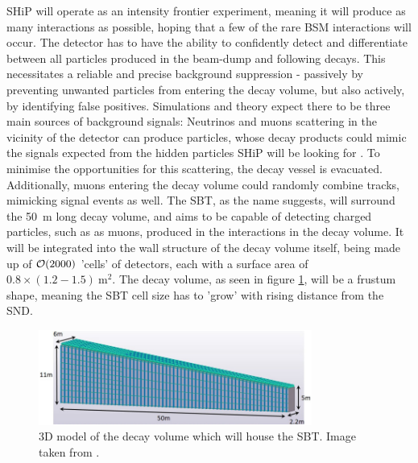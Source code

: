 	\ac{SHiP} will operate as an intensity frontier experiment, meaning it will produce as many interactions as possible, hoping that a few of the rare \ac{BSM} interactions will occur. The detector has to have the ability to confidently detect and differentiate between all particles produced in the beam-dump and following decays. This necessitates a reliable and precise background suppression - passively by preventing unwanted particles from entering the decay volume, but also actively, by identifying false positives. Simulations and theory expect there to be three main sources of background signals: Neutrinos and muons scattering in the vicinity of the detector can produce particles, whose decay products could mimic the signals expected from the hidden particles \ac{SHiP} will be looking for \cite{SHIP-proposal}. To minimise the opportunities for this scattering, the decay vessel is evacuated. Additionally, muons entering the decay volume could randomly combine tracks, mimicking signal events as well.	
	The \ac{SBT}, as the name suggests, will surround the \SI{50}{\meter} long decay volume, and aims to be capable of detecting charged particles, such as as muons, produced in the interactions in the decay volume. 
	It will be integrated into the wall structure of the decay volume itself, being made up of $\order{2000}$ 'cells' of detectors, each with a surface area of $0.8 \times (1.2 - 1.5) \SI{}{\square\meter}$. The decay volume, as seen in figure \ref{fig:decay-volume}, will be a frustum shape, meaning the \ac{SBT} cell size has to 'grow' with rising distance from the \ac{SND}.
	
	
	\begin{figure}[h]
		\centering
		\includegraphics[width=0.8\textwidth]{pictures/decay_volume.pdf}
		\caption{3D model of the decay volume which will house the \ac{SBT}. Image taken from \cite{MIANO}.}
		\label{fig:decay-volume}
	\end{figure}
	
